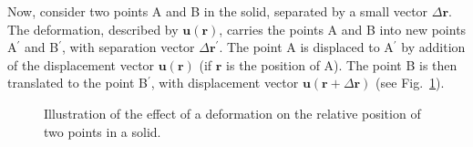 Now, consider two points A and B in the solid, separated by a small vector $\Delta\mathbf{r}$.  The deformation,  described by $\mathbf{u}(\mathbf{r})$, carries the points A and B into new points A$^{\prime}$ and B$^{\prime}$, with separation vector $\Delta\mathbf{r}^{\prime}$.  The point A is displaced to A$^{\prime}$ by addition of the displacement vector $\mathbf{u}(\mathbf{r})$ (if $\mathbf{r}$ is the position of A).  The point B is then translated to the point B$^{\prime}$, with displacement vector $\mathbf{u}(\mathbf{r}+\Delta\mathbf{r})$ (see Fig.~\ref{\chabbr:fig:h}).

\begin{figure}[b]
\caption{Illustration of the effect of a deformation on the relative position of two points in a solid.}
\label{\chabbr:fig:h}
\end{figure}

